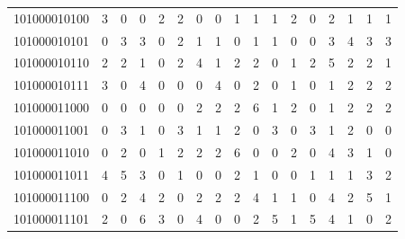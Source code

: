 \documentclass[10pt,a4paper]{article}
\begin{document}
\begin{longtable}{ |c|c|c|c|c|c|c|c|c|c|c|c|c|c|c|c|c| }
    101000010100              & 3                            & 0                                & 0                            & 2                              & 2   & 0   & 0   & 1   & 1   & 1   & 2   & 0   & 2   & 1   & 1   & 1   \\
    101000010101              & 0                            & 3                                & 3                            & 0                              & 2   & 1   & 1   & 0   & 1   & 1   & 0   & 0   & 3   & 4   & 3   & 3   \\
    101000010110              & 2                            & 2                                & 1                            & 0                              & 2   & 4   & 1   & 2   & 2   & 0   & 1   & 2   & 5   & 2   & 2   & 1   \\
    101000010111              & 3                            & 0                                & 4                            & 0                              & 0   & 0   & 4   & 0   & 2   & 0   & 1   & 0   & 1   & 2   & 2   & 2   \\
    101000011000              & 0                            & 0                                & 0                            & 0                              & 0   & 2   & 2   & 2   & 6   & 1   & 2   & 0   & 1   & 2   & 2   & 2   \\
    101000011001              & 0                            & 3                                & 1                            & 0                              & 3   & 1   & 1   & 2   & 0   & 3   & 0   & 3   & 1   & 2   & 0   & 0   \\
    101000011010              & 0                            & 2                                & 0                            & 1                              & 2   & 2   & 2   & 6   & 0   & 0   & 2   & 0   & 4   & 3   & 1   & 0   \\
    101000011011              & 4                            & 5                                & 3                            & 0                              & 1   & 0   & 0   & 2   & 1   & 0   & 0   & 1   & 1   & 1   & 3   & 2   \\
    101000011100              & 0                            & 2                                & 4                            & 2                              & 0   & 2   & 2   & 2   & 4   & 1   & 1   & 0   & 4   & 2   & 5   & 1   \\
    101000011101              & 2                            & 0                                & 6                            & 3                              & 0   & 4   & 0   & 0   & 2   & 5   & 1   & 5   & 4   & 1   & 0   & 2   \\

\end{longtable}
\end{document}
